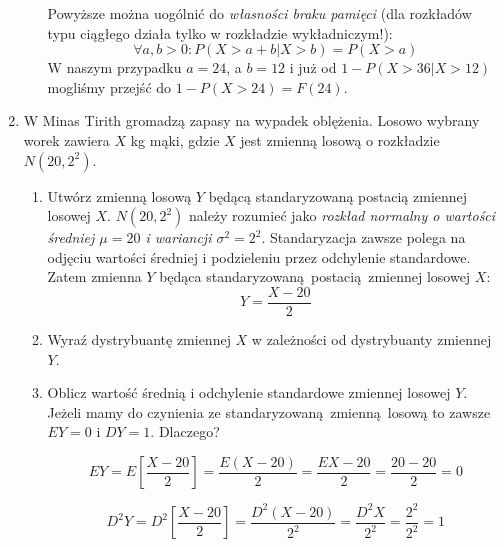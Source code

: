 \documentclass[twoside]{mwart}
\newcommand{\ans}[1]{}
\newenvironment{ansenv}{\comment}{\endcomment}
\newenvironment{ansenv}{\paragraph{Odpowiedź:}}{}
\newcommand{\ans}[1]{\begin{ansenv}#1\end{ansenv}}
\begin{document}
\begin{enumerate}
\begin{enumerate}
\begin{ansenv}
	Powyższe można uogólnić do \emph{własności braku pamięci} (dla rozkładów typu ciągłego działa tylko w rozkładzie wykładniczym!):
	\[ \forall a,b>0\colon P(X>a+b|X>b) = P(X>a) \]
	W naszym przypadku $a=24$, a $b=12$ i już od $1-P(X>36|X>12)$ mogliśmy przejść do $1-P(X>24)=F(24)$.
\end{ansenv}
\end{enumerate}
\item W Minas Tirith gromadzą zapasy na wypadek oblężenia. Losowo wybrany worek zawiera $X$ kg mąki, gdzie $X$ jest zmienną losową o rozkładzie $N(20,2^2)$.
\begin{enumerate}
\item Utwórz zmienną losową $Y$ będącą standaryzowaną postacią zmiennej losowej $X$.
\begin{ansenv}
	$N(20, 2^2)$ należy rozumieć jako \emph{rozkład normalny o wartości średniej $\mu=20$ i wariancji $\sigma^2=2^2$}.
	Standaryzacja zawsze polega na odjęciu wartości średniej i podzieleniu przez odchylenie standardowe. Zatem zmienna $Y$ będąca standaryzowaną postacią zmiennej losowej $X$:
	\[ Y=\frac{X-20}{2} \]
\end{ansenv}
\item Wyraź dystrybuantę zmiennej $X$ w zależności od dystrybuanty zmiennej $Y$. \ans{$F_X(x)=F_Y(\frac{x-20}{2})$}
\item Oblicz wartość średnią i odchylenie standardowe zmiennej losowej $Y$.
\begin{ansenv}
	Jeżeli mamy do czynienia ze standaryzowaną zmienną losową to zawsze $EY=0$ i $DY=1$. Dlaczego?
	
	\[ EY=E\left[\frac{X-20}{2}\right] = \frac{E(X-20)}{2} = \frac{EX-20}{2}=\frac{20-20}{2} = 0 \]
	
	\[ D^2Y=D^2\left[\frac{X-20}{2}\right] = \frac{D^2(X-20)}{2^2} = \frac{D^2X}{2^2} =\frac{2^2}{2^2} = 1\]
	

\end{ansenv}
\end{enumerate}
\end{enumerate}
\end{document}
